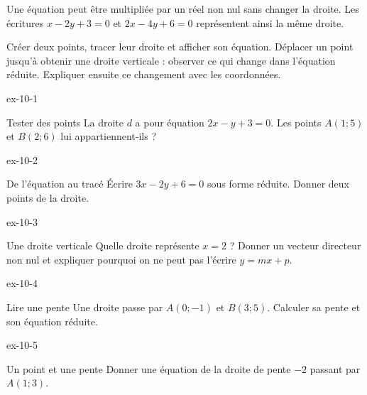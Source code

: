 \begin{attention}Une équation peut être multipliée par un réel non nul sans changer la droite. Les écritures $x-2y+3=0$ et $2x-4y+6=0$ représentent ainsi la même droite.\end{attention}
Créer deux points, tracer leur droite et afficher son équation. Déplacer un point jusqu’à obtenir une droite verticale : observer ce qui change dans l’équation réduite. Expliquer ensuite ce changement avec les coordonnées.
\clearpage{}
\begin{blocLivre}{ex-10-1}
\begin{exercice}[1]{Tester des points}
La droite $d$ a pour équation $2x-y+3=0$. Les points $A(1;5)$ et $B(2;6)$ lui appartiennent-ils ?
\label{fig-ex-10-1}
\end{exercice}
\end{blocLivre}
\begin{blocLivre}{ex-10-2}
\begin{exercice}[1]{De l’équation au tracé}
Écrire $3x-2y+6=0$ sous forme réduite. Donner deux points de la droite.
\label{fig-ex-10-2}
\end{exercice}
\end{blocLivre}
\begin{blocLivre}{ex-10-3}
\begin{exercice}[1]{Une droite verticale}
Quelle droite représente $x=2$ ? Donner un vecteur directeur non nul et expliquer pourquoi on ne peut pas l’écrire $y=mx+p$.
\label{fig-ex-10-3}
\end{exercice}
\end{blocLivre}
\begin{blocLivre}{ex-10-4}
\begin{exercice}[1]{Lire une pente}
Une droite passe par $A(0;-1)$ et $B(3;5)$. Calculer sa pente et son équation réduite.
\label{fig-ex-10-4}
\end{exercice}
\end{blocLivre}
\begin{blocLivre}{ex-10-5}
\begin{exercice}[1]{Un point et une pente}
Donner une équation de la droite de pente $-2$ passant par $A(1;3)$.
\label{fig-ex-10-5}
\end{exercice}
\end{blocLivre}

